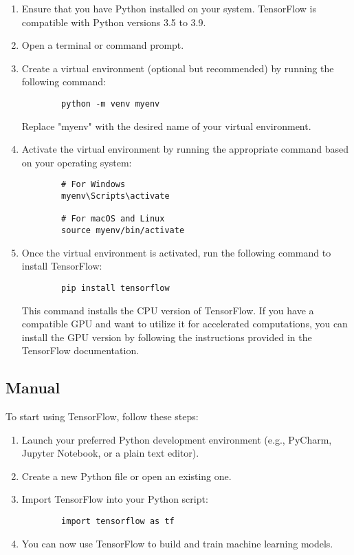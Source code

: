 \begin{enumerate}
	\item Ensure that you have Python installed on your system. TensorFlow is compatible with Python versions 3.5 to 3.9.
	\item Open a terminal or command prompt.
	\item Create a virtual environment (optional but recommended) by running the following command:
	\begin{verbatim}
		python -m venv myenv
	\end{verbatim}
	Replace "myenv" with the desired name of your virtual environment.
	\item Activate the virtual environment by running the appropriate command based on your operating system:
	\begin{verbatim}
		# For Windows
		myenv\Scripts\activate
		
		# For macOS and Linux
		source myenv/bin/activate
	\end{verbatim}
	\item Once the virtual environment is activated, run the following command to install TensorFlow:
	\begin{verbatim}
		pip install tensorflow
	\end{verbatim}
	This command installs the CPU version of TensorFlow. If you have a compatible GPU and want to utilize it for accelerated computations, you can install the GPU version by following the instructions provided in the TensorFlow documentation.
\end{enumerate}

\subsection{Manual}

To start using TensorFlow, follow these steps:

\begin{enumerate}
	\item Launch your preferred Python development environment (e.g., PyCharm, Jupyter Notebook, or a plain text editor).
	\item Create a new Python file or open an existing one.
	\item Import TensorFlow into your Python script:
	\begin{verbatim}
		import tensorflow as tf
	\end{verbatim}
	\item You can now use TensorFlow to build and train machine learning models. 
\end{enumerate}

